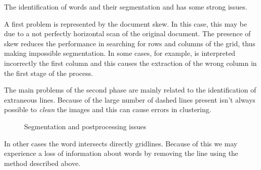The identification of words and their segmentation and has some strong issues.

A first problem is represented by the document skew. In this case, this may be due to a not perfectly horizontal scan of the original document. The presence of skew reduces the performance in searching for rows and columns of the grid, thus making impossible segmentation. In some cases, for example, is interpreted incorrectly the first column and this causes the extraction of the wrong column in the first stage of the process.

The main problems of the second phase are mainly related to the identification of extraneous lines. Because of the large number of dashed lines present isn't always possible to \emph{clean} the images and this can cause errors in clustering.

\begin{figure}[!ht]
 \centering
 \hspace{5mm}
 \caption{Segmentation and postprocessing issues}
 \end{figure}

In other cases the word intersects directly gridlines. Because of this we may experience a loss of information about words by removing the line using the method described above.

